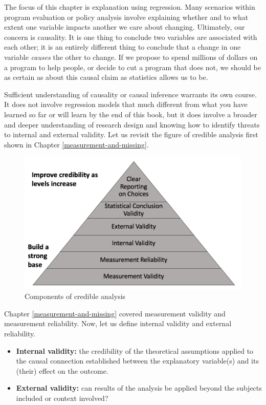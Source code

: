 \documentclass[
]{book}
\providecommand{\tightlist}{%
  \setlength{\itemsep}{0pt}\setlength{\parskip}{0pt}}
\begin{document}
The focus of this chapter is explanation using regression. Many scenarios within program evaluation or policy analysis involve explaining whether and to what extent one variable impacts another we care about changing. Ultimately, our concern is causality. It is one thing to conclude two variables are associated with each other; it is an entirely different thing to conclude that a change in one variable \emph{causes} the other to change. If we propose to spend millions of dollars on a program to help people, or decide to cut a program that does not, we should be as certain as about this causal claim as statistics allows us to be.

Sufficient understanding of causality or causal inference warrants its own course. It does not involve regression models that much different from what you have learned so far or will learn by the end of this book, but it does involve a broader and deeper understanding of research design and knowing how to identify threats to internal and external validity. Let us revisit the figure of credible analysis first shown in Chapter \ref{measurement-and-missing}.

\begin{figure}

{\centering \includegraphics[width=\textwidth]{images/credible} 

}

\caption{Components of credible analysis}\label{fig:credfigrepeat}
\end{figure}

Chapter \ref{measurement-and-missing} covered measurement validity and measurement reliability. Now, let us define internal validity and external reliability.

\begin{itemize}
\tightlist
\item
  \textbf{Internal validity:} the credibility of the theoretical assumptions applied to the causal connection established between the explanatory variable(s) and its (their) effect on the outcome.
\item
  \textbf{External validity:} can results of the analysis be applied beyond the subjects included or context involved?
\end{itemize}
\end{document}
